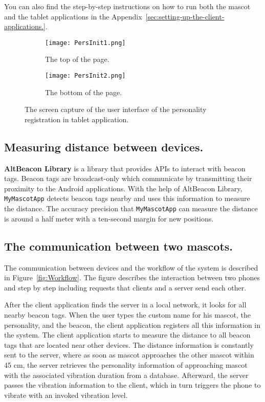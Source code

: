 You can also find the step-by-step instructions on how to run both the mascot and the tablet applications in the
Appendix~\ref{sec:setting-up-the-client-applications.}.

\begin{figure}[hbt!]
    \centering
    \begin{subfigure}{.40\textwidth}
        \centering
        \texttt{[image: PersInit1.png]}
        \caption{The top of the page.}
        \label{fig:sub1}
    \end{subfigure}\hfill%
    \begin{subfigure}{.40\textwidth}
        \centering
        \texttt{[image: PersInit2.png]}
        \caption{The bottom of the page.}
        \label{fig:sub2}
    \end{subfigure}\hfill
    \caption{The screen capture of the user interface of the personality registration in tablet application.}
    \label{fig:PersInit}
\end{figure}

\subsection{Measuring distance between devices.}
\label{subsec:measuring-distance-between-devices.}
\textbf{AltBeacon Library} is a library that provides APIs to interact with beacon tags.
Beacon tags are broadcast-only which communicate by transmitting their proximity to the Android applications.
With the help of AltBeacon Library, \texttt{MyMascotApp} detects beacon tags nearby
and uses this information to measure the distance.
The accuracy precision that \texttt{MyMascotApp} can measure the distance is around a half meter
with a ten-second margin for new positions.

\subsection{The communication between two mascots.}
\label{subsec:the-communication-between-two-mascots.}
The communication between devices and the workflow of the system is described in Figure~\ref{fig:Workflow}.
The figure describes the interaction between two phones and step by step including requests
that clients and a server send each other.

After the client application finds the server in a local network, it looks for all nearby beacon tags.
When the user types the custom name for his mascot, the personality, and the beacon, the client
application registers all this information in the system.
The client application starts to measure the distance to all beacon tags that are located near other devices.
The distance information is constantly sent to the server, where as soon as mascot approaches the other mascot within
45 cm, the server retrieves the personality information of approaching mascot with the associated vibration duration
from a database.
Afterward, the server passes the vibration information to the client, which in turn triggers the
phone to vibrate with an invoked vibration level.


